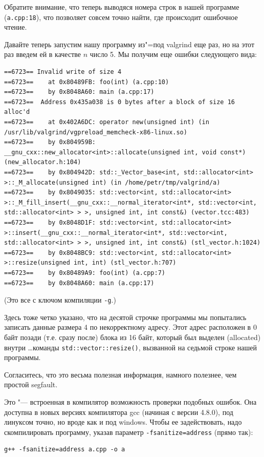 \documentclass[a4paper,10pt]{problems}
\begin{document}
Обратите внимание, что теперь выводяся номера строк в нашей программе (\verb`a.cpp:18`), что позволяет совсем точно найти, где происходит ошибочное чтение.

Давайте теперь запустим нашу программу из"=под valgrind еще раз, но на этот раз введем ей в качестве $n$ число 5. Мы получим еще ошибки следующего вида:
\begin{verbatim}
==6723== Invalid write of size 4
==6723==    at 0x80489FB: foo(int) (a.cpp:10)
==6723==    by 0x8048A60: main (a.cpp:17)
==6723==  Address 0x435a038 is 0 bytes after a block of size 16 alloc'd
==6723==    at 0x402A6DC: operator new(unsigned int) (in /usr/lib/valgrind/vgpreload_memcheck-x86-linux.so)
==6723==    by 0x804959B: __gnu_cxx::new_allocator<int>::allocate(unsigned int, void const*) (new_allocator.h:104)
==6723==    by 0x804942D: std::_Vector_base<int, std::allocator<int> >::_M_allocate(unsigned int) (in /home/petr/tmp/valgrind/a)
==6723==    by 0x8049035: std::vector<int, std::allocator<int> >::_M_fill_insert(__gnu_cxx::__normal_iterator<int*, std::vector<int, std::allocator<int> > >, unsigned int, int const&) (vector.tcc:483)
==6723==    by 0x8048D1F: std::vector<int, std::allocator<int> >::insert(__gnu_cxx::__normal_iterator<int*, std::vector<int, std::allocator<int> > >, unsigned int, int const&) (stl_vector.h:1024)
==6723==    by 0x8048BC9: std::vector<int, std::allocator<int> >::resize(unsigned int, int) (stl_vector.h:707)
==6723==    by 0x80489A9: foo(int) (a.cpp:7)
==6723==    by 0x8048A60: main (a.cpp:17)
\end{verbatim}
(Это все с ключом компиляции \verb`-g`.)

Здесь тоже четко указано, что на десятой строчке программы мы попытались записать данные размера 4 по некорректному адресу. 
Этот адрес расположен в 0 байт позади (т.е. сразу после) блока из 16 байт, который был выделен (allocated) внутри \dots команды \verb`std::vector::resize()`,
вызванной на седьмой строке нашей программы.

Согласитесь, что это весьма полезная информация, намного полезнее, чем простой segfault.

Это "--- встроенная в компилятор возможность проверки подобных ошибок.
Она доступна в новых версиях компилятора gcc (начиная с версии 4.8.0), под линуксом точно, но вроде как и под windows.
Чтобы ее задействовать, надо скомпилировать программу, указав параметр \verb`-fsanitize=address` (прямо так):
\begin{verbatim}
g++ -fsanitize=address a.cpp -o a
\end{verbatim}
\end{document}

